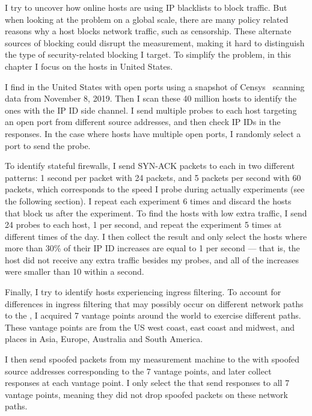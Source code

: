 I try to uncover how online hosts are using IP blacklists to
block traffic. But when looking at the problem on a global scale, there are
many policy related reasons why a host blocks network traffic,
such as censorship. These alternate sources of blocking could disrupt the
measurement, making it hard to distinguish the type of security-related 
blocking I target. To simplify the problem, in this chapter I focus on 
the hosts in United States.

I find {} in the United States with open ports using a snapshot
of Censys~\cite{censys} scanning data from November 8, 2019. Then I scan 
these 40 million hosts to identify the ones with the IP ID side channel. 
I send multiple probes to each host targeting an open port from different
source addresses, and then check IP IDs in the responses. In the case where 
hosts have multiple open ports, I randomly select a port to send the probe.

To identify stateful firewalls, I send SYN-ACK packets to each {}
in two different patterns: 1 second per packet with 24 packets, and 5 packets
per second with 60 packets, which corresponds to the speed I probe
{} during actually experiments (see the following section). I
repeat each experiment 6 times and discard the hosts that block us after the
experiment. To find the hosts with low extra traffic, I send 24 probes
to each host, 1 per second, and repeat the experiment 5 times at different
times of the day. I then collect the result and only select the hosts where
more than 30\% of their IP ID increases are equal to 1 per second --- that is,
the host did not receive any extra traffic besides my probes,
and all of the increases were smaller than 10 within a second.

Finally, I try to identify hosts experiencing ingress filtering. To
account for differences in ingress filtering that may possibly occur on
different network paths to the {}, I acquired 7 vantage points 
around the world to exercise different paths. These vantage points are
from the US west coast, east coast and midwest, and places in Asia, Europe,
Australia and South America.

I then send spoofed packets from my measurement
machine to the {} with spoofed source addresses corresponding to
the 7 vantage points, and later collect responses at each vantage point.
I only select the {} that send responses to all 7
vantage points, meaning they did not drop spoofed packets on these network paths.


